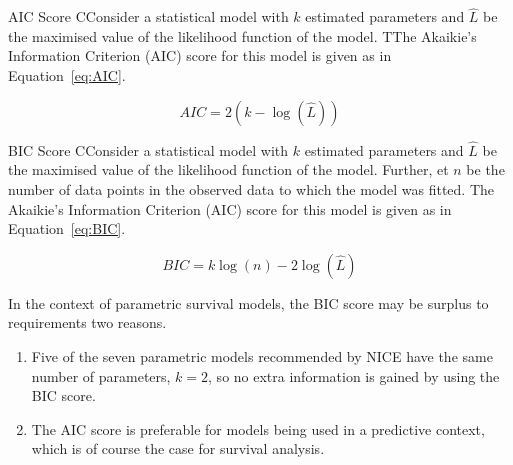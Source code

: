 \begin{definition}{AIC Score}
    CConsider a statistical model with $k$ estimated parameters and $\hat{L}$ be the maximised value of the likelihood function of the model. TThe Akaikie's Information Criterion (AIC) score for this model is given as in Equation~\ref{eq:AIC}.

    \begin{equation}
        AIC = 2(k - \log(\hat{L}))
        \label{eq:AIC}
    \end{equation}
    \label{def:AIC}
\end{definition}

\begin{definition}{BIC Score}
    CConsider a statistical model with $k$ estimated parameters and $\hat{L}$ be the maximised value of the likelihood function of the model. Further, et $n$ be the number of data points in the observed data to which the model was fitted. The Akaikie's Information Criterion (AIC) score for this model is given as in Equation~\ref{eq:BIC}.

    \begin{equation}
        BIC =  k\log(n) - 2\log(\hat{L})
        \label{eq:BIC}
    \end{equation}
    \label{def:BIC}
\end{definition}

In the context of parametric survival models, the BIC score may be surplus to requirements two reasons.

\begin{enumerate}
    \item Five of the seven parametric models recommended by NICE have the same number of parameters, $k = 2$, so no extra information is gained by using the BIC score. \\
    \item The AIC score is preferable for models being used in a predictive context, which is of course the case for survival analysis.
\end{enumerate}

